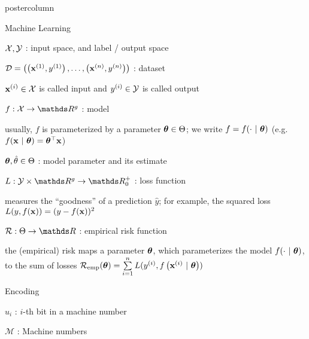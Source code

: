 \documentclass{beamer}
\begin{document}
\begin{frame}[fragile]{}
\begin{columns}
\begin{column}{.31\textwidth}
\begin{beamercolorbox}[center]{postercolumn}
\begin{minipage}{.98\textwidth}
{					\begin{myblock}{Machine Learning}
						\begin{codebox}
							$\mathcal{X}, \mathcal{Y}$ : input space, and label / output space 
						\end{codebox}
						\hspace*{1ex}
						\begin{codebox}
							 $\mathcal{D} = \left( \left(\mathbf{x}^{(1)}, y^{(1)}\right), \ldots, \left(\mathbf{x}^{(n)}, y^{(n)}\right)\right)$ : dataset
						\end{codebox}
						\hspace*{1ex} $\mathbf{x}^{(i)} \in \mathcal{X}$ is called input and $y^{(i)} \in \mathcal{Y}$ is called output \\
						\begin{codebox}
							 $f: \Xspace \to \R^g$ : model
						\end{codebox}
						\hspace*{1ex} usually, $f$ is parameterized by a parameter $\bm{\theta} \in \Theta$; we write $f = f(\cdot ~|~ \bm{\theta})$ (e.g. $f(\mathbf{x} ~|~ \bm{\theta}) = \bm{\theta}^\top \mathbf{x}$)\\
						\begin{codebox}
							 $\bm{\theta}, \hat{\theta} \in \Theta$ : model parameter and its estimate
						\end{codebox}
						\hspace*{1ex}
						\begin{codebox}
							 $L: \Yspace \times \R^g \to \R^+_0$ : loss function
						\end{codebox}
						\hspace*{1ex} measures the \enquote{goodness} of a prediction $\hat y$; for example, the squared loss $L(y, f(\mathbf{x})) = (y - f(\mathbf{x}))^2$ \\
						\begin{codebox}
							 $\risk: \Theta \to \R$ : empirical risk function
						\end{codebox}
						\hspace*{1ex} the (empirical) risk maps a parameter $\bm{\theta}$, which parameterizes the model $f(\cdot ~|~ \bm{\theta})$, to the sum of losses
						$\mathcal{R}_{\text{emp}}(\bm{\theta}) = \sum\limits_{i=1}^n L(y^{(i)}, f\left(\mathbf{x}^{(i)} ~|~ \bm{\theta}\right))$
					\end{myblock}
					\begin{myblock}{Encoding}
						\begin{codebox}
							$u_i$ : $i$-th bit in a machine number
						\end{codebox}
						\hspace*{1ex}
						\begin{codebox}
						$\mathcal{M}$ : Machine numbers
						\end{codebox}

\end{myblock}}
\end{minipage}
\end{beamercolorbox}
\end{column}
\end{columns}
\end{frame}
\end{document}
